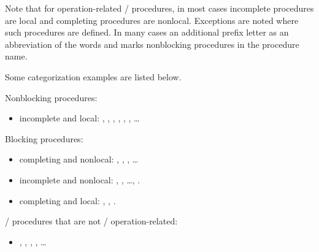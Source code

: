 \begin{users}
Note that for operation-related \MPI/ procedures, in most cases
incomplete procedures are local and completing procedures are nonlocal.
Exceptions are noted where such procedures are defined.
In many cases an additional prefix
letter  as an abbreviation of the words 
and  marks nonblocking procedures in the procedure name.

\noindent Some categorization examples are listed below.

\noindent Nonblocking procedures:
\begin{itemize}
\item incomplete and local: , ,  ,
, , , \ldots
\end{itemize}
\noindent Blocking procedures:
\begin{itemize}
\item completing and nonlocal: , , , \ldots
\item incomplete and nonlocal: , , \ldots,
%
%
%
%
%
%
.
\item completing and local: , , .
\end{itemize}
\noindent \MPI/ procedures that are not \MPI/ operation-related:
\begin{itemize}
\item
{}, , ,  , \ldots
\end{itemize}
\end{users}

